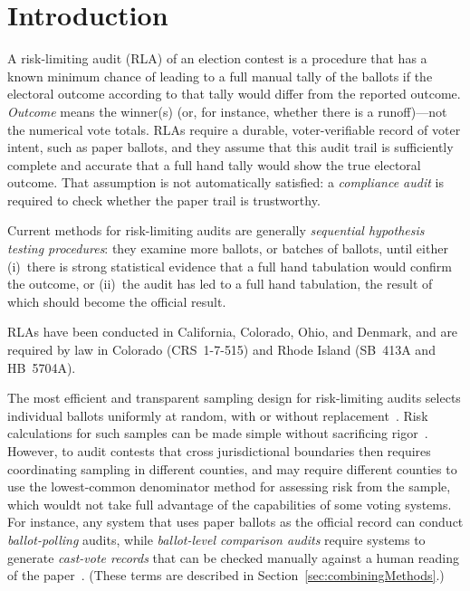 \documentclass[runningheads]{llncs}
\begin{document}
\section{Introduction}
A risk-limiting audit (RLA) of an election contest is a procedure that
has a known minimum chance of leading to a full manual tally of the ballots if the electoral outcome  according to that tally would differ from the reported outcome.
\emph{Outcome} means the winner(s) (or, for instance, whether there is a runoff)---not the numerical vote totals. 
RLAs require a durable, voter-verifiable record of voter intent, such as paper ballots,
and they assume that this audit trail is sufficiently complete and accurate that a full hand
tally would show the true electoral outcome.
That assumption is not automatically satisfied: a \emph{compliance audit}
\cite{starkWagner12} 
is required to check whether the paper trail is trustworthy.

Current methods for risk-limiting audits are generally \emph{sequential hypothesis testing procedures}: they examine more ballots, or batches of ballots,
until either (i)~there is strong statistical evidence that a full hand tabulation would confirm the outcome,
or (ii)~the audit has led to a full hand tabulation, the result of which should become the official
result.

RLAs have been conducted in California, Colorado, Ohio, and Denmark, and are required by law in Colorado (CRS~1-7-515) and Rhode Island (SB~413A and HB~5704A).

The most efficient and transparent sampling design for risk-limiting audits selects individual ballots uniformly at random, with or without replacement~\cite{stark10c}.
Risk calculations for such samples can be made simple without sacrificing rigor~\cite{stark10d,lindemanStark12}.
However, to audit contests that cross jurisdictional boundaries then requires coordinating sampling in different counties, and may require different counties to use the lowest-common denominator method for assessing risk from the sample, which wouldt not take full advantage of the capabilities of some voting systems. 
For instance, any system that uses paper ballots as the official record can conduct \emph{ballot-polling} audits, while \emph{ballot-level comparison audits} require systems to generate \emph{cast-vote records} that can be checked manually against a human reading of the paper~\cite{lindemanEtal12,lindemanStark12}. 
(These terms are described in Section~\ref{sec:combiningMethods}.) 
\end{document}
